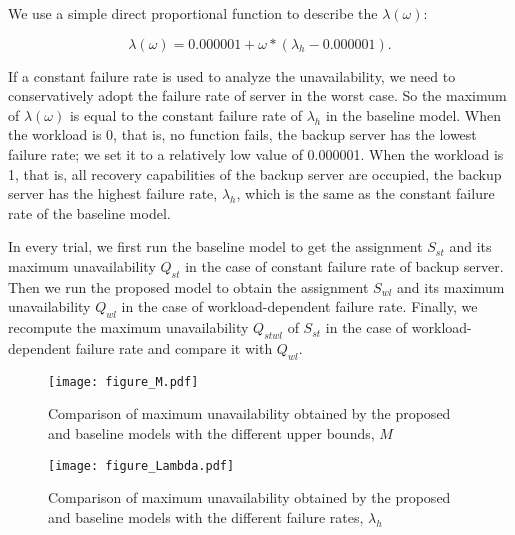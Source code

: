 \documentclass[conference]{IEEEtran}
\begin{document}
We use a simple direct proportional function to describe the $\lambda(\omega)$:

\begin{equation}
    \lambda(\omega)=0.000001+\omega*(\lambda_h-0.000001).
\end{equation}

If a constant failure rate is used to analyze the unavailability, we need to conservatively adopt the failure rate of server in the worst case. So the maximum of $\lambda(\omega)$ is equal to the constant failure rate of $\lambda_h$ in the baseline model. When the workload is 0, that is, no function fails, the backup server has the lowest failure rate; we set it to a relatively low value of 0.000001. When the workload is 1, that is, all recovery capabilities of the backup server are occupied, the backup server has the highest failure rate, $\lambda_h$, which is the same as the constant failure rate of the baseline model. 


In every trial, we first run the baseline model to get the assignment $S_{st}$ and its maximum unavailability $Q_{st}$ in the case of constant failure rate of backup server. Then we run the proposed model to obtain the assignment $S_{wl}$ and its maximum unavailability $Q_{wl}$ in the case of workload-dependent failure rate. Finally, we recompute the maximum unavailability $Q_{stwl}$ of $S_{st}$ in the case of workload-dependent failure rate and compare it with $Q_{wl}$.

\begin{figure}[ht]
\begin{minipage}[b]{0.48\linewidth}
\centering
\texttt{[image: figure\_M.pdf]}
\caption{Comparison of maximum unavailability obtained by the proposed and baseline models with the different upper bounds, $M$}
\end{minipage}
\hspace{0.1cm}
\begin{minipage}[b]{0.48\linewidth}
\centering
\texttt{[image: figure\_Lambda.pdf]}
\caption{Comparison of maximum unavailability obtained by the proposed and baseline models with the different failure rates, $\lambda_h$}
\end{minipage}
\end{figure}

\end{document}
